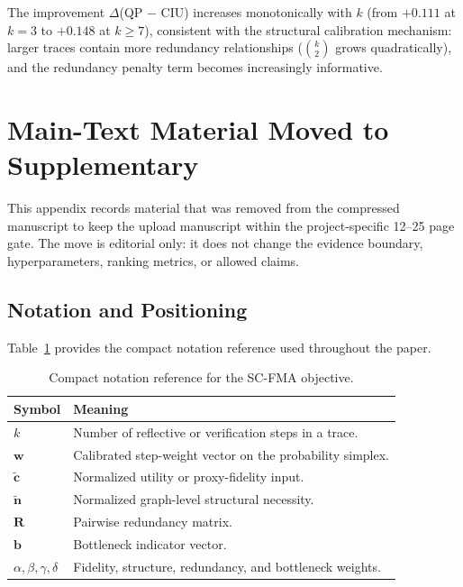 \documentclass[a4paper,fleqn]{cas-sc}
\begin{document}
The improvement $\Delta$(QP $-$ CIU) increases monotonically with $k$ (from $+0.111$ at $k=3$ to $+0.148$ at $k \ge 7$), consistent with the structural calibration mechanism: larger traces contain more redundancy relationships ($\binom{k}{2}$ grows quadratically), and the redundancy penalty term becomes increasingly informative.

\section{Main-Text Material Moved to Supplementary}
\label{app:moved-main-material}

This appendix records material that was removed from the compressed manuscript to keep the upload manuscript within the project-specific 12--25 page gate. The move is editorial only: it does not change the evidence boundary, hyperparameters, ranking metrics, or allowed claims.

\subsection{Notation and Positioning}
\label{app:notation-positioning}

Table~\ref{tab:supp-notation} provides the compact notation reference used throughout the paper.

\begin{table}[ht]
\caption{Compact notation reference for the SC-FMA objective.}
\label{tab:supp-notation}
\centering
\small
\begin{tabular}{ll}
\toprule
\textbf{Symbol} & \textbf{Meaning} \\
\midrule
$k$ & Number of reflective or verification steps in a trace. \\
$\mathbf{w}$ & Calibrated step-weight vector on the probability simplex. \\
$\tilde{\mathbf{c}}$ & Normalized utility or proxy-fidelity input. \\
$\tilde{\mathbf{n}}$ & Normalized graph-level structural necessity. \\
$\mathbf{R}$ & Pairwise redundancy matrix. \\
$\mathbf{b}$ & Bottleneck indicator vector. \\
$\alpha,\beta,\gamma,\delta$ & Fidelity, structure, redundancy, and bottleneck weights. \\
\bottomrule
\end{tabular}
\end{table}
\end{document}
